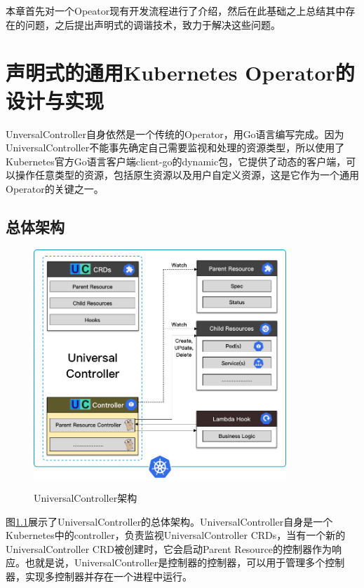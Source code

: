 \documentclass[macfonts,master]{njuthesis}
\begin{document}
本章首先对一个Opeator现有开发流程进行了介绍，然后在此基础之上总结其中存在的问题，之后提出声明式的调谐技术，致力于解决这些问题。

\chapter{声明式的通用Kubernetes Operator的设计与实现}\label{chapter_implement}
UnversalController自身依然是一个传统的Operator，用Go语言编写完成。因为UniversalController不能事先确定自己需要监视和处理的资源类型，所以使用了Kubernetes官方Go语言客户端client-go的dynamic包，它提供了动态的客户端，可以操作任意类型的资源，包括原生资源以及用户自定义资源，这是它作为一个通用Operator的关键之一。

\section{总体架构}

\begin{figure}[htbp]
  \centering
  \includegraphics[width= 0.85\textwidth]{pics/uc-arch.png}\\
  \caption{UniversalController架构}\label{fig:uc-arch}
\end{figure}

图\ref{fig:uc-arch}展示了UniversalController的总体架构。UniversalController自身是一个Kubernetes中的controller，负责监视UniversalController CRDs，当有一个新的UniversalController CRD被创建时，它会启动Parent Resource的控制器作为响应。也就是说，UniversalController是控制器的控制器，可以用于管理多个控制器，实现多控制器并存在一个进程中运行。
\end{document}
